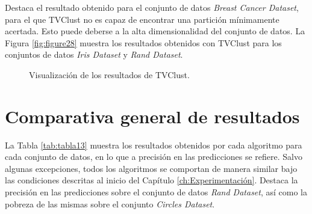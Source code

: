 Destaca el resultado obtenido para el conjunto de datos \textit{Breast Cancer Dataset}, para el que \acs{TVClust} no es capaz de encontrar una partición mínimamente acertada. Esto puede deberse a la alta dimensionalidad del conjunto de datos. La Figura \ref{fig:figure28} muestra los resultados obtenidos con \acs{TVClust} para los conjuntos de datos \textit{Iris Dataset} y \textit{Rand Dataset}. 


\begin{figure}[bth]
	\myfloatalign
	\caption{Visualización de los resultados de \acs{TVClust}.}\label{fig:figure29}
\end{figure}

\clearpage

\section{Comparativa general de resultados}

La Tabla \ref{tab:tabla13} muestra los resultados obtenidos por cada algoritmo para cada conjunto de datos, en lo que a precisión en las predicciones se refiere. Salvo algunas excepciones, todos los algoritmos se comportan de manera similar bajo las condiciones descritas al inicio del Capítulo \ref{ch:Experimentación}. Destaca la precisión en las predicciones sobre el conjunto de datos \textit{Rand Dataset}, así como la pobreza de las mismas sobre el conjunto \textit{Circles Dataset}.

